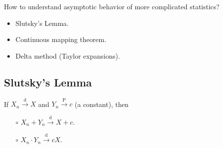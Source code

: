 \documentclass[a4paper]{article}
\begin{document}
\begin{question}
	How to understand asymptotic behavior of more complicated statistics?
\end{question}

\begin{answer}
	\quad
	\begin{itemize}
		\item Slutsky's Lemma.
		\item Continuous mapping theorem.
		\item Delta method (Taylor expansions).
	\end{itemize}
\end{answer}

\subsection{Slutsky's Lemma}

\begin{thm}
	If $X_n \stackrel{\text{d}}{\longrightarrow} X$ and $Y_n \stackrel{\text{P}}{\longrightarrow} c$ (a constant), then
		\begin{itemize}
			\item[$\circ$] $X_n + Y_n \stackrel{\text{d}}{\longrightarrow} X+c$.
			\item[$\circ$] $X_n \cdot Y_n \stackrel{\text{d}}{\longrightarrow} cX$.
		\end{itemize}
\end{thm}
\end{document}

